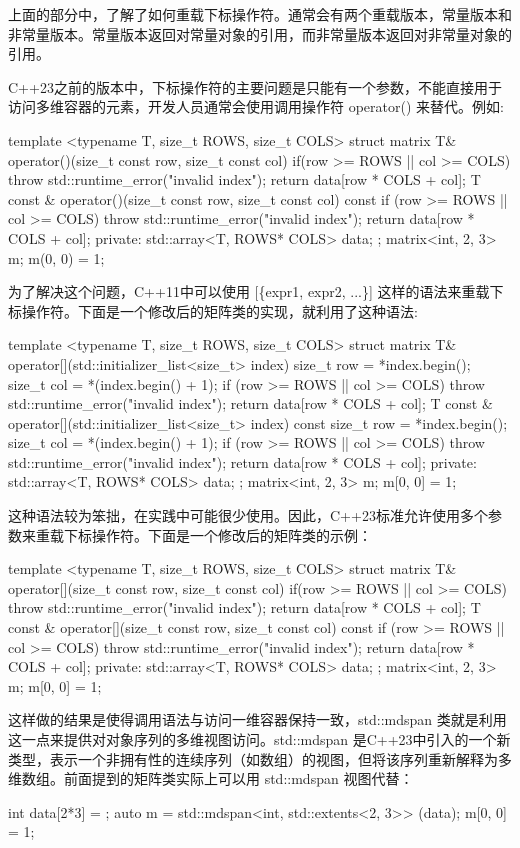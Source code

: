 上面的部分中，了解了如何重载下标操作符。通常会有两个重载版本，常量版本和非常量版本。常量版本返回对常量对象的引用，而非常量版本返回对非常量对象的引用。

C++23之前的版本中，下标操作符的主要问题是只能有一个参数，不能直接用于访问多维容器的元素，开发人员通常会使用调用操作符 operator() 来替代。例如:

\begin{cpp}
template <typename T, size_t ROWS, size_t COLS>
struct matrix
{
    T& operator()(size_t const row, size_t const col)
    {
        if(row >= ROWS || col >= COLS)
        throw std::runtime_error("invalid index");
        return data[row * COLS + col];
    }
    T const & operator()(size_t const row, size_t const col) const
    {
        if (row >= ROWS || col >= COLS)
        throw std::runtime_error("invalid index");
        return data[row * COLS + col];
    }
private:
    std::array<T, ROWS* COLS> data;
};
matrix<int, 2, 3> m;
m(0, 0) = 1;
\end{cpp}

为了解决这个问题，C++11中可以使用 [\{expr1, expr2, ...\}] 这样的语法来重载下标操作符。下面是一个修改后的矩阵类的实现，就利用了这种语法:

\begin{cpp}
template <typename T, size_t ROWS, size_t COLS>
struct matrix
{
    T& operator[](std::initializer_list<size_t> index)
    {
        size_t row = *index.begin();
        size_t col = *(index.begin() + 1);
        if (row >= ROWS || col >= COLS)
        throw std::runtime_error("invalid index");
        return data[row * COLS + col];
    }
    T const & operator[](std::initializer_list<size_t> index) const
    {
        size_t row = *index.begin();
        size_t col = *(index.begin() + 1);
        if (row >= ROWS || col >= COLS)
        throw std::runtime_error("invalid index");
        return data[row * COLS + col];
    }
    private:
    std::array<T, ROWS* COLS> data;
};
matrix<int, 2, 3> m;
m[{0, 0}] = 1;
\end{cpp}

这种语法较为笨拙，在实践中可能很少使用。因此，C++23标准允许使用多个参数来重载下标操作符。下面是一个修改后的矩阵类的示例：

\begin{cpp}
template <typename T, size_t ROWS, size_t COLS>
struct matrix
{
    T& operator[](size_t const row, size_t const col)
    {
        if(row >= ROWS || col >= COLS)
        throw std::runtime_error("invalid index");
        return data[row * COLS + col];
    }
    T const & operator[](size_t const row, size_t const col) const
    {
        if (row >= ROWS || col >= COLS)
        throw std::runtime_error("invalid index");
        return data[row * COLS + col];
    }
    private:
    std::array<T, ROWS* COLS> data;
};
matrix<int, 2, 3> m;
m[0, 0] = 1;
\end{cpp}

这样做的结果是使得调用语法与访问一维容器保持一致，std::mdspan 类就是利用这一点来提供对对象序列的多维视图访问。std::mdspan 是C++23中引入的一个新类型，表示一个非拥有性的连续序列（如数组）的视图，但将该序列重新解释为多维数组。前面提到的矩阵类实际上可以用 std::mdspan 视图代替：

\begin{cpp}
int data[2*3] = {};
auto m = std::mdspan<int, std::extents<2, 3>> (data);
m[0, 0] = 1;
\end{cpp}






